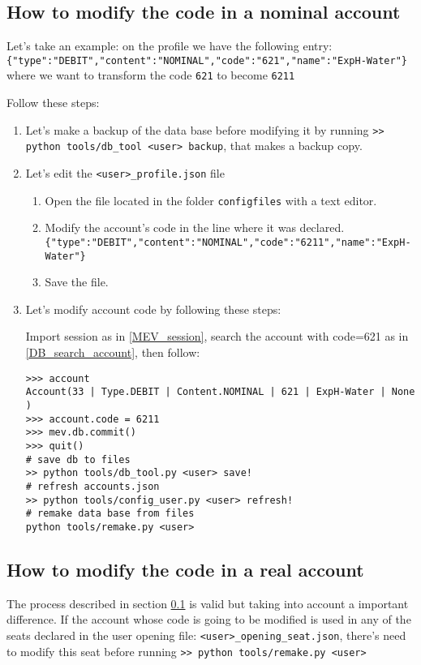 \documentclass[12pt, a4paper]{article}
\begin{document}
\subsection{How to modify the code in a nominal account}  \label{NOMINAL_CODE}
Let's take an example: on the profile we have the following entry:\\
\verb!{"type":"DEBIT","content":"NOMINAL","code":"621","name":"ExpH-Water"}!
where we want to transform the code \verb!621! to become \verb!6211!

Follow these steps:
\begin{enumerate}
\item Let's make a backup of the data base before modifying it by running 
\verb!>> python tools/db_tool <user> backup!, that makes a backup copy.
\item Let's edit the \verb!<user>_profile.json! file
\begin{enumerate}
 \item Open the file  located in the folder \verb!configfiles! with a text editor.
 \item Modify the account's code in the line where it was declared. \\
 \verb!{"type":"DEBIT","content":"NOMINAL","code":"6211","name":"ExpH-Water"}!
 \item Save the file.
\end{enumerate}
\item Let's modify account code by following these steps:
 
Import session as in \ref{MEV_session}, search the account with code=621 as in \ref{DB_search_account}, then follow:
\begin{verbatim}
>>> account
Account(33 | Type.DEBIT | Content.NOMINAL | 621 | ExpH-Water | None )
>>> account.code = 6211
>>> mev.db.commit()
>>> quit()
# save db to files
>> python tools/db_tool.py <user> save!
# refresh accounts.json
>> python tools/config_user.py <user> refresh!
# remake data base from files
python tools/remake.py <user>
\end{verbatim}
\end{enumerate}
 \subsection{How to modify the code in a real account}  
 The process described in section \ref{NOMINAL_CODE} is valid but taking into account a important difference.
 If the account whose code is going to be modified is used in any of the seats declared in the user opening file: \verb!<user>_opening_seat.json!, there's  need to modify this seat  before running \verb!>> python tools/remake.py <user>!
 
\end{document}
